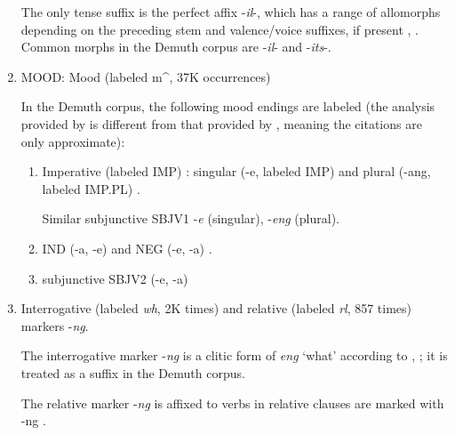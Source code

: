 \documentclass[11pt,letterpaper]{article}
\begin{document}
\begin{enumerate}
    The only tense suffix is the perfect affix -\textit{il}-, which has a range of allomorphs depending on the preceding stem and valence/voice suffixes, if present \cite[]{doke1967textbook}, \cite[p. 167]{guma1971outline}. %
    Common morphs in the Demuth corpus are -\textit{il}- and -\textit{its}-.
    
     
    \item MOOD: Mood (labeled m\^{}, 37K occurrences)
    
    In the Demuth corpus, the following mood endings are labeled (the analysis provided by \cite{demuth1992acquisition} is different from that provided by \cite{doke1967textbook}, meaning the citations are only approximate):
    
    \begin{enumerate}
    \item Imperative (labeled IMP) \cite[--387]{doke1967textbook}: singular (-e, labeled IMP) \cite[]{doke1967textbook} and plural (-ang, labeled IMP.PL) \cite[]{doke1967textbook}.
    
    Similar subjunctive SBJV1 -\textit{e} (singular), -\textit{eng} (plural).
    
    \item IND (-a, -e) and NEG  (-e, -a) \cite[--421]{doke1967textbook}.
    
    \item subjunctive SBJV2 (-e, -a)  \cite[--455]{doke1967textbook}
    \end{enumerate}
    
    
    
    \item Interrogative (labeled \textit{wh}, 2K times) and relative (labeled \textit{rl}, 857 times) markers -\textit{ng}.
    
    The interrogative marker -\textit{ng} is a clitic form of \textit{eng} `what' according to \cite[p. 168]{guma1971outline}, \cite[, 320, 714]{doke1967textbook}; it is treated as a suffix in the Demuth corpus.
    
    The relative marker -\textit{ng} is affixed to verbs in relative clauses are marked with -ng \cite[, 793]{doke1967textbook}.
    

\end{enumerate}
\end{document}
